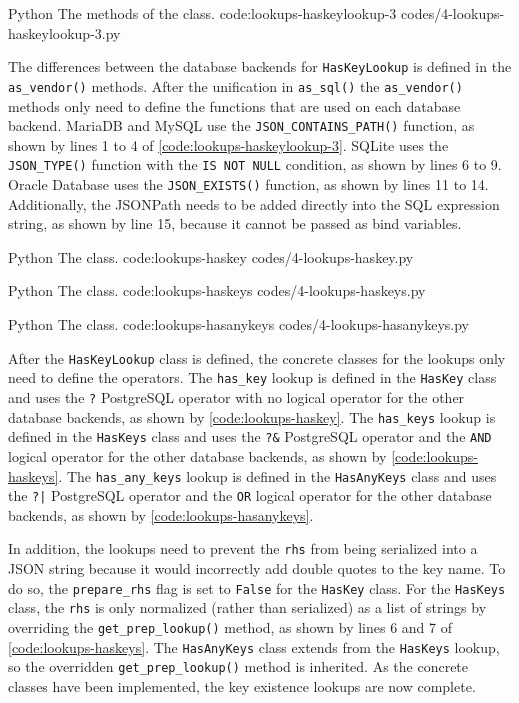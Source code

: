 \listing
{Python}
{The  methods of the  class.}
{code:lookups-haskeylookup-3}
{codes/4-lookups-haskeylookup-3.py}

The differences between the database backends for \verb|HasKeyLookup| is
defined in the \verb|as_vendor()| methods. After the unification in
\verb|as_sql()| the \verb|as_vendor()| methods only need to define the
functions that are used on each database backend. MariaDB and MySQL use the
\verb|JSON_CONTAINS_PATH()| function, as shown by lines 1 to 4 of
\autoref{code:lookups-haskeylookup-3}. SQLite uses the \verb|JSON_TYPE()|
function with the \verb|IS NOT NULL| condition, as shown by lines 6 to 9.
Oracle Database uses the \verb|JSON_EXISTS()| function, as shown by lines 11 to
14. Additionally, the JSONPath needs to be added directly into the SQL
expression string, as shown by line 15, because it cannot be passed as bind
variables.

\listing
{Python}
{The  class.}
{code:lookups-haskey}
{codes/4-lookups-haskey.py}

\listing
{Python}
{The  class.}
{code:lookups-haskeys}
{codes/4-lookups-haskeys.py}

\listing
{Python}
{The  class.}
{code:lookups-hasanykeys}
{codes/4-lookups-hasanykeys.py}

After the \verb|HasKeyLookup| class is defined, the concrete classes for the
lookups only need to define the operators. The \verb|has_key| lookup is defined
in the \verb|HasKey| class and uses the \verb|?| PostgreSQL operator with no
logical operator for the other database backends, as shown by
\autoref{code:lookups-haskey}. The \verb|has_keys| lookup is defined in the
\verb|HasKeys| class and uses the \verb|?&| PostgreSQL operator and the
\verb|AND| logical operator for the other database backends, as shown by
\autoref{code:lookups-haskeys}. The \verb|has_any_keys| lookup is defined in
the \verb|HasAnyKeys| class and uses the \verb=?|= PostgreSQL operator and the
\verb|OR| logical operator for the other database backends, as shown by
\autoref{code:lookups-hasanykeys}.

In addition, the lookups need to prevent the \verb|rhs| from being serialized
into a JSON string because it would incorrectly add double quotes to the key
name. To do so, the \verb|prepare_rhs| flag is set to \verb|False| for the
\verb|HasKey| class. For the \verb|HasKeys| class, the \verb|rhs| is only
normalized (rather than serialized) as a list of strings by overriding the
\verb|get_prep_lookup()| method, as shown by lines 6 and 7 of
\autoref{code:lookups-haskeys}. The \verb|HasAnyKeys| class extends from the
\verb|HasKeys| lookup, so the overridden \verb|get_prep_lookup()| method is
inherited. As the concrete classes have been implemented, the key existence
lookups are now complete.

